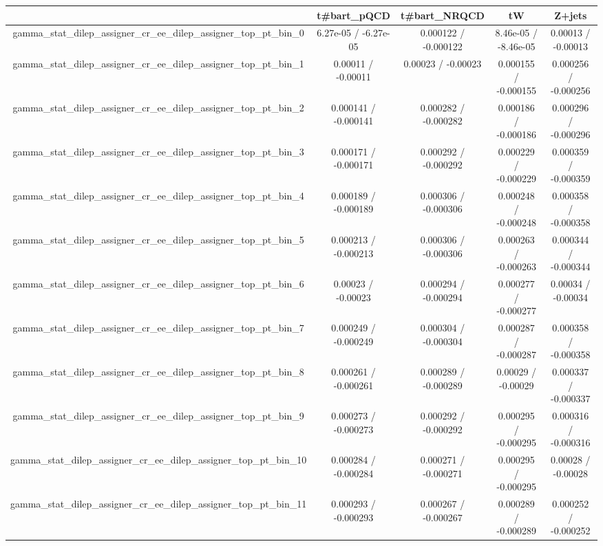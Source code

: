 \documentclass[10pt]{article}
\begin{document}
\begin{table}[htbp]
\begin{center}
\begin{tabular}{|c|c|c|c|c|}
\hline 
      & t#bar{t}_{pQCD}      & t#bar{t}_{NRQCD}      & tW      & Z+jets \\ 
\hline 
  gamma_stat_dilep_assigner_cr_ee_dilep_assigner_top_pt_bin_0 & 6.27e-05 / -6.27e-05 & 0.000122 / -0.000122 & 8.46e-05 / -8.46e-05 & 0.00013 / -0.00013 \\ 
  gamma_stat_dilep_assigner_cr_ee_dilep_assigner_top_pt_bin_1 & 0.00011 / -0.00011 & 0.00023 / -0.00023 & 0.000155 / -0.000155 & 0.000256 / -0.000256 \\ 
  gamma_stat_dilep_assigner_cr_ee_dilep_assigner_top_pt_bin_2 & 0.000141 / -0.000141 & 0.000282 / -0.000282 & 0.000186 / -0.000186 & 0.000296 / -0.000296 \\ 
  gamma_stat_dilep_assigner_cr_ee_dilep_assigner_top_pt_bin_3 & 0.000171 / -0.000171 & 0.000292 / -0.000292 & 0.000229 / -0.000229 & 0.000359 / -0.000359 \\ 
  gamma_stat_dilep_assigner_cr_ee_dilep_assigner_top_pt_bin_4 & 0.000189 / -0.000189 & 0.000306 / -0.000306 & 0.000248 / -0.000248 & 0.000358 / -0.000358 \\ 
  gamma_stat_dilep_assigner_cr_ee_dilep_assigner_top_pt_bin_5 & 0.000213 / -0.000213 & 0.000306 / -0.000306 & 0.000263 / -0.000263 & 0.000344 / -0.000344 \\ 
  gamma_stat_dilep_assigner_cr_ee_dilep_assigner_top_pt_bin_6 & 0.00023 / -0.00023 & 0.000294 / -0.000294 & 0.000277 / -0.000277 & 0.00034 / -0.00034 \\ 
  gamma_stat_dilep_assigner_cr_ee_dilep_assigner_top_pt_bin_7 & 0.000249 / -0.000249 & 0.000304 / -0.000304 & 0.000287 / -0.000287 & 0.000358 / -0.000358 \\ 
  gamma_stat_dilep_assigner_cr_ee_dilep_assigner_top_pt_bin_8 & 0.000261 / -0.000261 & 0.000289 / -0.000289 & 0.00029 / -0.00029 & 0.000337 / -0.000337 \\ 
  gamma_stat_dilep_assigner_cr_ee_dilep_assigner_top_pt_bin_9 & 0.000273 / -0.000273 & 0.000292 / -0.000292 & 0.000295 / -0.000295 & 0.000316 / -0.000316 \\ 
  gamma_stat_dilep_assigner_cr_ee_dilep_assigner_top_pt_bin_10 & 0.000284 / -0.000284 & 0.000271 / -0.000271 & 0.000295 / -0.000295 & 0.00028 / -0.00028 \\ 
  gamma_stat_dilep_assigner_cr_ee_dilep_assigner_top_pt_bin_11 & 0.000293 / -0.000293 & 0.000267 / -0.000267 & 0.000289 / -0.000289 & 0.000252 / -0.000252 \\ 

\end{tabular}
\end{center}
\end{table}
\end{document}
